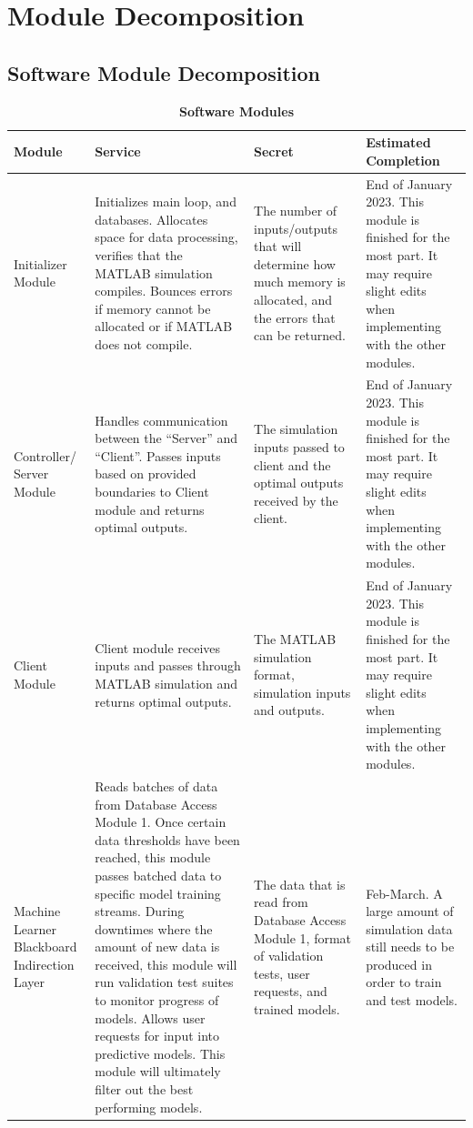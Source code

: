 \documentclass[12pt, titlepage]{article}
\begin{document}
\section{Module Decomposition}
\subsection{Software Module Decomposition}
\begin{longtable}{|p{2cm}|p{3cm}|p{3cm}|p{3cm}}
  \caption{\bf Software Modules}\\
    \hline
    \bf Module & \bf Service & \bf Secret & \bf Estimated Completion\\
    \hline
    Initializer Module & Initializes main loop, and databases.  Allocates space for data processing, verifies that the MATLAB simulation compiles. Bounces errors if memory cannot be allocated or if MATLAB does not compile.  & The number of inputs/outputs that will determine how much memory is allocated, and the errors that can be returned. & End of January 2023. This module is finished for the most part. It may require slight edits when implementing with the other modules.\\
    \hline 
    Controller/ Server Module & Handles communication between the “Server” and “Client”. Passes inputs based on provided boundaries to Client module and returns optimal outputs. & The simulation inputs passed to client and the optimal outputs received by the client. & End of January 2023. This module is finished for the most part. It may require slight edits when implementing with the other modules.\\
    \hline 
    Client Module & Client module receives inputs and passes through MATLAB simulation and returns optimal outputs. & The MATLAB simulation format, simulation inputs and outputs. & End of January 2023. This module is finished for the most part. It may require slight edits when implementing with the other modules.\\
    \hline 
    Machine Learner Blackboard Indirection Layer & Reads batches of data from Database Access Module 1. Once certain data thresholds have been reached, this module passes batched data to specific model training streams. During downtimes where the amount of new data is received, this module will run validation test suites to monitor progress of models. Allows user requests for input into predictive models. This module will ultimately filter out the best performing models. & The data that is read from Database Access Module 1, format of validation tests, user requests, and trained models. & Feb-March. A large amount of simulation data still needs to be produced in order to train and test models.\\

\end{longtable}
\end{document}
